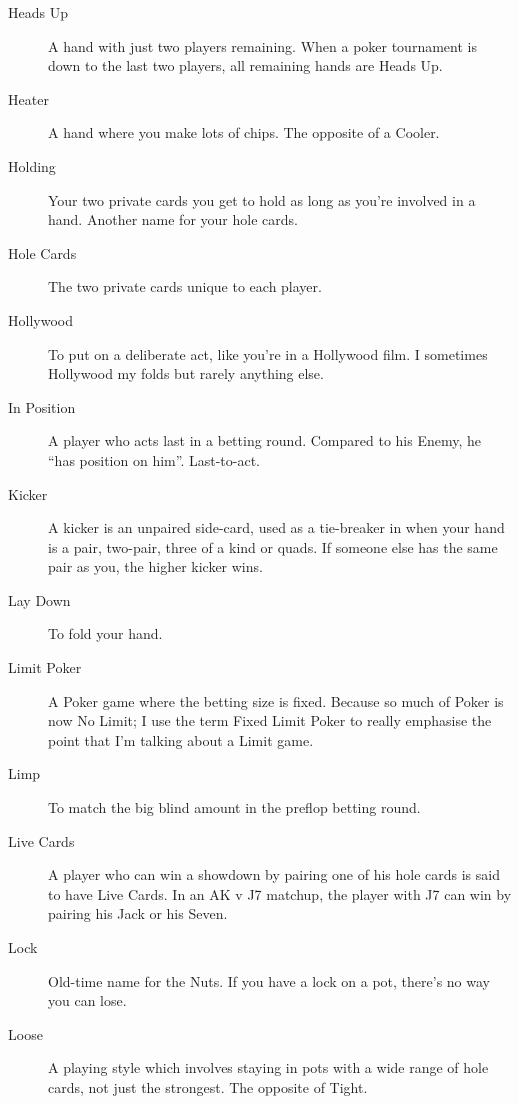 \begin{description}
\item[Heads Up] A hand with just two players remaining. When a poker
tournament is down to the last two players, all remaining hands are
Heads Up.

\item[Heater] A hand where you make lots of chips. The opposite of a
Cooler.

\item[Holding] Your two private cards you get to hold as long as
you're involved in a hand. Another name for your hole cards.

\item[Hole Cards] The two private cards unique to each player.

\item[Hollywood] To put on a deliberate act, like you're in a
Hollywood film. I sometimes Hollywood my folds but rarely anything
else.

\item[In Position] A player who acts last in a betting round. Compared
to his Enemy, he ``has position on him''. Last-to-act.

\item[Kicker] A kicker is an unpaired side-card, used as a tie-breaker
in when your hand is a pair, two-pair, three of a kind or quads. If
someone else has the same pair as you, the higher kicker wins.

\item[Lay Down] To fold your hand.

\item[Limit Poker] A Poker game where the betting size is
fixed. Because so much of Poker is now No Limit; I use the term
Fixed Limit Poker to really emphasise the point that I'm talking about
a Limit game.

\item[Limp] To match the big blind amount in the preflop betting
round.

\item[Live Cards] A player who can win a showdown by pairing one of
his hole cards is said to have Live Cards. In an AK v J7 matchup, the
player with J7 can win by pairing his Jack or his Seven.

\item[Lock] Old-time name for the Nuts. If you have a lock on a pot,
there's no way you can lose.

\item[Loose] A playing style which involves staying in pots with a
wide range of hole cards, not just the strongest. The opposite of
Tight.


\end{description}

